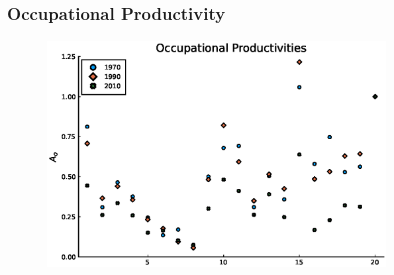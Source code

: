 \documentclass[11pt]{beamer}
\begin{document}
\begin{frame}
	\frametitle{Occupational Productivity}
	\begin{figure}
		\begin{center}
			\includegraphics[width=0.8\textwidth]{plots/A_men_70_10.eps}
			\label{ }
		\end{center}
	\end{figure}
	\hyperlink{occupations}{}
	\hyperlink{barriers3}{}
\end{frame}
\end{document}
